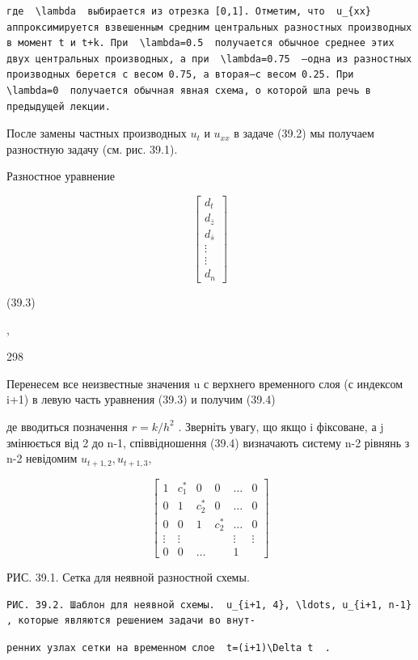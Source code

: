 \documentclass[
  ukrainian,
]{article}
\begin{document}
\begin{verbatim}
где  \lambda  выбирается из отрезка [0,1]. Отметим, что  u_{xx}  аппроксимируется взвешенным средним центральных разностных производных в момент t и t+k. При  \lambda=0.5  получается обычное среднее этих двух центральных производных, а при  \lambda=0.75  —одна из разностных производных берется с весом 0.75, а вторая—с весом 0.25. При  \lambda=0  получается обычная явная схема, о которой шла речь в предыдущей лекции.
\end{verbatim}

После замены частных производных \(u_t\) и \(u_{xx}\) в задаче (39.2) мы
получаем разностную задачу (см. рис. 39.1).

Разностное уравнение

\[
\begin{bmatrix} d_t \\ d_{\bar{z}} \\ d_{\bar{s}} \\ \vdots \\ \vdots \\ d_n \end{bmatrix}
\]

(39.3)

,

298

Перенесем все неизвестные значения u с верхнего временного слоя (с
индексом i+1) в левую часть уравнения (39.3) и получим (39.4)

де вводиться позначення \(r = k/h^2\) . Зверніть увагу, що якщо i
фіксоване, а j змінюється від 2 до n-1, співвідношення (39.4) визначають
систему n-2 рівнянь з n-2 невідомим \(u_{t+1,2}, u_{t+1,3},\)

\[
\begin{bmatrix} 1 & c_1^* & 0 & 0 & \dots & 0 \\ 0 & 1 & c_2^* & 0 & \dots & 0 \\ 0 & 0 & 1 & c_2^* & \dots & 0 \\ \vdots & \vdots & & & \vdots & \vdots \\ 0 & 0 & \dots & & 1 \end{bmatrix}
\]

РИС. 39.1. Сетка для неявной разностной схемы.

\begin{verbatim}
РИС. 39.2. Шаблон для неявной схемы.  u_{i+1, 4}, \ldots, u_{i+1, n-1}  , которые являются решением задачи во внут-
\end{verbatim}

\begin{verbatim}
ренних узлах сетки на временном слое  t=(i+1)\Delta t  .
\end{verbatim}
\end{document}
